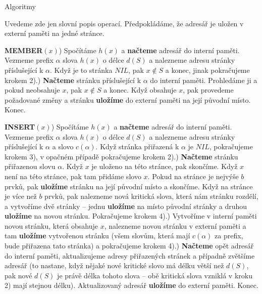 \documentclass[a4paper,12pt]{article}
\begin{document}
\subhead
Algoritmy
\endsubhead
\bigskip

Uvedeme zde jen slovní popis operací. Předpokládáme, že adresář 
je uložen v externí paměti na jedné stránce.

{\bf MEMBER$(x)$}) Spočítáme $h(x)$ a {\bf načteme} adresář do interní paměti. 
Vez\-me\-me prefix $\alpha$ slova $h(x)$ o délce $d(S)$ a nalezneme 
adresu stránky příslušející k $\alpha$. Když je to stránka 
$NIL$, pak $x\notin S$ a konec, jinak pokračujeme krokem 
2).) {\bf Načteme} stránku příslušející k $\alpha$ do interní 
paměti. Prohle\-dá\-me ji a pokud neobsahuje $x$, pak $x\notin 
S$ a 
konec. Když obsahuje $x$, pak provedeme požadované 
změny a stránku {\bf ulo\-ží\-me} do externí paměti na její 
původní místo. Konec.

{\bf INSERT$(x)$}) Spočítáme $h(x)$ a {\bf načteme} adresář do interní paměti. 
Vez\-me\-me prefix $\alpha$ slova $h(x)$ o délce $d(S)$ a nalezneme 
adresu stránky příslušející k $\alpha$ a slovo $
c(\alpha )$. 
Když stránka přiřazená k $\alpha$ je $NIL$, pokraču\-je\-me krokem 
3), v opačném případě pokraču\-je\-me krokem 2).) {\bf Načteme} stránku přiřazenou slovu $\alpha$. Když $
x$ je 
uloženo na této stránce, pak skončíme. Když $x$ není na 
této stránce, pak tam přidáme slovo $x$. Pokud na stránce 
je nejvýše $b$ prvků, pak {\bf uložíme} stránku 
na její původní místo a skončíme. Když na 
stránce je více než $b$ prvků, pak nalezneme nová 
kritická slova, 
která nám stránku rozdělí, a vytvoříme dvě stránky -- 
jednu {\bf uložíme} na místo původní stránky a 
druhou {\bf uložíme} na novou stránku. Pokračujeme krokem 
4).) Vytvoříme v interní paměti novou stránku, která 
obsahuje $x$, nalezneme novou stránku v externí paměti a 
tam {\bf uložíme} vytvořenou stránku (všem slovům, 
která mají $c(\alpha )$ za prefix, bude přiřazena tato stránka) a 
pokračujeme krokem 4).) {\bf Načteme} opět adresář do interní paměti, 
aktualizujeme adresy přiřazených stránek a případně 
zvětšíme adresář (to nastane, když nějaké nové kritické 
slovo má délku větší než $d(S)$, pak nové $d(S
)$ je právě 
délka tohoto slova -- obě kritická slova vzniklá v kroku 
2) mají stejnou délku). Aktualizovaný adresář {\bf uložíme} do 
externí paměti. Konec.
\end{document}
